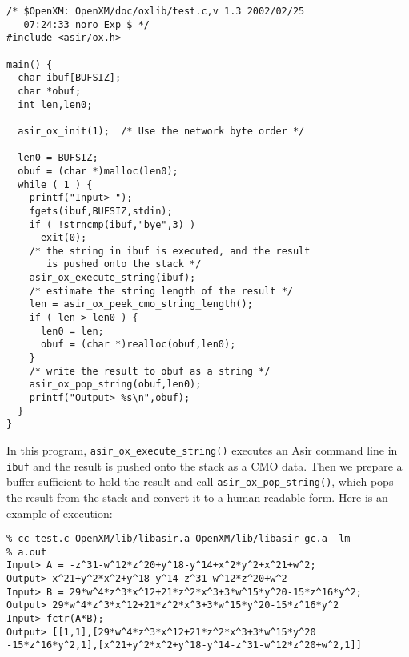 \documentclass[runningheads]{cl2emult}
\begin{document}
\begin{verbatim}
/* $OpenXM: OpenXM/doc/oxlib/test.c,v 1.3 2002/02/25 
   07:24:33 noro Exp $ */
#include <asir/ox.h>

main() {
  char ibuf[BUFSIZ];  
  char *obuf;  
  int len,len0;  

  asir_ox_init(1);  /* Use the network byte order */  

  len0 = BUFSIZ;  
  obuf = (char *)malloc(len0);  
  while ( 1 ) {  
    printf("Input> ");
    fgets(ibuf,BUFSIZ,stdin);    
    if ( !strncmp(ibuf,"bye",3) )    
      exit(0);      
    /* the string in ibuf is executed, and the result 
       is pushed onto the stack */
    asir_ox_execute_string(ibuf);    
    /* estimate the string length of the result */
    len = asir_ox_peek_cmo_string_length();    
    if ( len > len0 ) {    
      len0 = len;      
      obuf = (char *)realloc(obuf,len0);      
    }    
    /* write the result to obuf as a string */
    asir_ox_pop_string(obuf,len0);    
    printf("Output> %s\n",obuf);    
  }  
}
\end{verbatim}
In this program, \verb+asir_ox_execute_string()+ executes an Asir command line
in {\tt ibuf} and the result is pushed onto the stack as a CMO data.
Then we prepare a buffer sufficient to hold the result and call 
\verb+asir_ox_pop_string()+, which pops the result from the stack
and convert it to a human readable form. Here is an example of execution:
\begin{verbatim}
% cc test.c OpenXM/lib/libasir.a OpenXM/lib/libasir-gc.a -lm
% a.out
Input> A = -z^31-w^12*z^20+y^18-y^14+x^2*y^2+x^21+w^2;
Output> x^21+y^2*x^2+y^18-y^14-z^31-w^12*z^20+w^2
Input> B = 29*w^4*z^3*x^12+21*z^2*x^3+3*w^15*y^20-15*z^16*y^2;
Output> 29*w^4*z^3*x^12+21*z^2*x^3+3*w^15*y^20-15*z^16*y^2
Input> fctr(A*B);
Output> [[1,1],[29*w^4*z^3*x^12+21*z^2*x^3+3*w^15*y^20
-15*z^16*y^2,1],[x^21+y^2*x^2+y^18-y^14-z^31-w^12*z^20+w^2,1]]
\end{verbatim}
\end{document}
